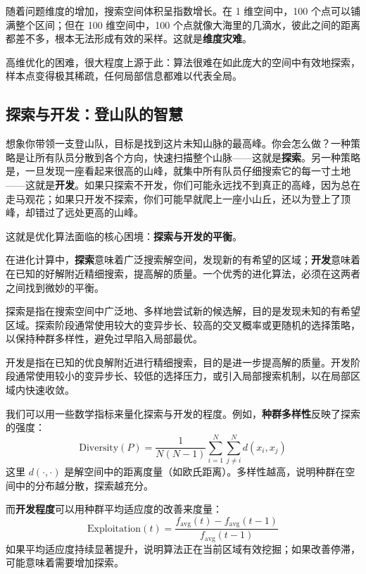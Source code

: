 \documentclass[lang=cn,zihao=-4,a4paper,fontset=windows]{beautybook}
\begin{document}
随着问题维度的增加，搜索空间体积呈指数增长。在 1 维空间中，100 个点可以铺满整个区间；但在 100 维空间中，100 个点就像大海里的几滴水，彼此之间的距离都差不多，根本无法形成有效的采样。这就是\textbf{维度灾难}。

高维优化的困难，很大程度上源于此：算法很难在如此庞大的空间中有效地探索，样本点变得极其稀疏，任何局部信息都难以代表全局。

\subsection{探索与开发：登山队的智慧}

想象你带领一支登山队，目标是找到这片未知山脉的最高峰。你会怎么做？一种策略是让所有队员分散到各个方向，快速扫描整个山脉——这就是\textbf{探索}。另一种策略是，一旦发现一座看起来很高的山峰，就集中所有队员仔细搜索它的每一寸土地——这就是\textbf{开发}。如果只探索不开发，你们可能永远找不到真正的高峰，因为总在走马观花；如果只开发不探索，你们可能早就爬上一座小山丘，还以为登上了顶峰，却错过了远处更高的山峰。

这就是优化算法面临的核心困境：\textbf{探索与开发的平衡}。

在进化计算中，\textbf{探索}意味着广泛搜索解空间，发现新的有希望的区域；\textbf{开发}意味着在已知的好解附近精细搜索，提高解的质量。一个优秀的进化算法，必须在这两者之间找到微妙的平衡。

\begin{definition}[][探索（Exploration）]
探索是指在搜索空间中广泛地、多样地尝试新的候选解，目的是发现未知的有希望区域。探索阶段通常使用较大的变异步长、较高的交叉概率或更随机的选择策略，以保持种群多样性，避免过早陷入局部最优。
\end{definition}

\begin{definition}[][开发（Exploitation）]
开发是指在已知的优良解附近进行精细搜索，目的是进一步提高解的质量。开发阶段通常使用较小的变异步长、较低的选择压力，或引入局部搜索机制，以在局部区域内快速收敛。
\end{definition}

我们可以用一些数学指标来量化探索与开发的程度。例如，\textbf{种群多样性}反映了探索的强度：
\[
\text{Diversity}(P) = \frac{1}{N(N-1)} \sum_{i=1}^N \sum_{j\neq i}^N d(x_i, x_j)
\]
这里 $d(\cdot,\cdot)$ 是解空间中的距离度量（如欧氏距离）。多样性越高，说明种群在空间中的分布越分散，探索越充分。

而\textbf{开发程度}可以用种群平均适应度的改善来度量：
\[
\text{Exploitation}(t) = \frac{f_{\text{avg}}(t) - f_{\text{avg}}(t-1)}{f_{\text{avg}}(t-1)}
\]
如果平均适应度持续显著提升，说明算法正在当前区域有效挖掘；如果改善停滞，可能意味着需要增加探索。
\end{document}
